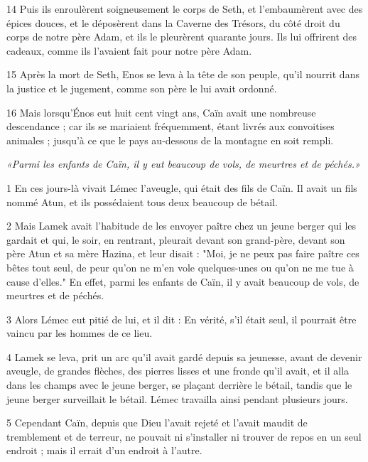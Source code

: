 \par 14 Puis ils enroulèrent soigneusement le corps de Seth, et l'embaumèrent avec des épices douces, et le déposèrent dans la Caverne des Trésors, du côté droit du corps de notre père Adam, et ils le pleurèrent quarante jours. Ils lui offrirent des cadeaux, comme ils l'avaient fait pour notre père Adam.

\par 15 Après la mort de Seth, Enos se leva à la tête de son peuple, qu'il nourrit dans la justice et le jugement, comme son père le lui avait ordonné.

\par 16 Mais lorsqu'Énos eut huit cent vingt ans, Caïn avait une nombreuse descendance ; car ils se mariaient fréquemment, étant livrés aux convoitises animales ; jusqu'à ce que le pays au-dessous de la montagne en soit rempli.


\par \textit{«Parmi les enfants de Caïn, il y eut beaucoup de vols, de meurtres et de péchés.»}

\par 1 En ces jours-là vivait Lémec l'aveugle, qui était des fils de Caïn. Il avait un fils nommé Atun, et ils possédaient tous deux beaucoup de bétail.

\par 2 Mais Lamek avait l'habitude de les envoyer paître chez un jeune berger qui les gardait et qui, le soir, en rentrant, pleurait devant son grand-père, devant son père Atun et sa mère Hazina, et leur disait : "Moi, je ne peux pas faire paître ces bêtes tout seul, de peur qu'on ne m'en vole quelques-unes ou qu'on ne me tue à cause d'elles." En effet, parmi les enfants de Caïn, il y avait beaucoup de vols, de meurtres et de péchés.

\par 3 Alors Lémec eut pitié de lui, et il dit : En vérité, s'il était seul, il pourrait être vaincu par les hommes de ce lieu.

\par 4 Lamek se leva, prit un arc qu'il avait gardé depuis sa jeunesse, avant de devenir aveugle, de grandes flèches, des pierres lisses et une fronde qu'il avait, et il alla dans les champs avec le jeune berger, se plaçant derrière le bétail, tandis que le jeune berger surveillait le bétail. Lémec travailla ainsi pendant plusieurs jours.

\par 5 Cependant Caïn, depuis que Dieu l'avait rejeté et l'avait maudit de tremblement et de terreur, ne pouvait ni s'installer ni trouver de repos en un seul endroit ; mais il errait d'un endroit à l'autre.

